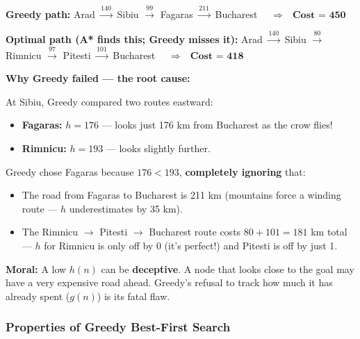 \documentclass[12pt, a4paper]{article}
\newenvironment{answerbox}{\begin{mdframed}[style=answerframe]}{\end{mdframed}}
\begin{document}
\vspace{0.4em}

\noindent\textbf{Greedy path:} Arad $\xrightarrow{140}$ Sibiu $\xrightarrow{99}$ Fagaras $\xrightarrow{211}$ Bucharest
$\quad\Rightarrow\quad \textbf{Cost = 450}$

\noindent\textbf{Optimal path (A* finds this; Greedy misses it):} Arad $\xrightarrow{140}$ Sibiu $\xrightarrow{80}$ Rimnicu $\xrightarrow{97}$ Pitesti $\xrightarrow{101}$ Bucharest
$\quad\Rightarrow\quad \textbf{Cost = 418}$

\begin{answerbox}
\textbf{Why Greedy failed — the root cause:}

At Sibiu, Greedy compared two routes eastward:
\begin{itemize}[noitemsep]
  \item \textbf{Fagaras:} $h{=}176$ — looks just 176 km from Bucharest as the crow flies!
  \item \textbf{Rimnicu:} $h{=}193$ — looks slightly further.
\end{itemize}

Greedy chose Fagaras because $176 < 193$, \textbf{completely ignoring} that:
\begin{itemize}[noitemsep]
  \item The road from Fagaras to Bucharest is 211 km (mountains force a winding route — $h$ underestimates by 35 km).
  \item The Rimnicu $\to$ Pitesti $\to$ Bucharest route costs $80+101=181$ km total — $h$ for Rimnicu is only off by 0 (it's perfect!) and Pitesti is off by just 1.
\end{itemize}

\textbf{Moral:} A low $h(n)$ can be \textbf{deceptive}. A node that looks close to the goal may have a very expensive road ahead. Greedy's refusal to track how much it has already spent ($g(n)$) is its fatal flaw.
\end{answerbox}

\subsubsection*{Properties of Greedy Best-First Search}
\end{document}
